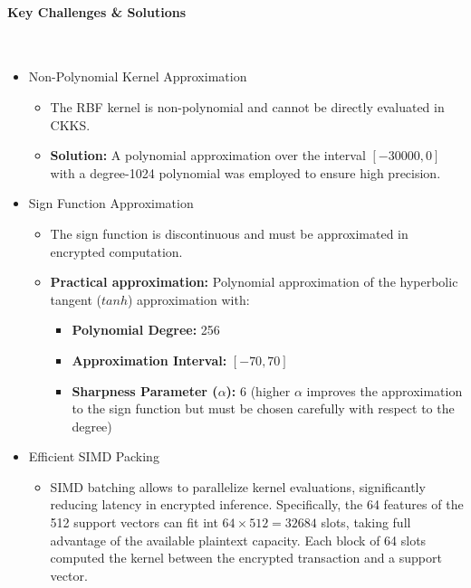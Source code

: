 \documentclass[article]{iacrtrans}
\begin{document}
\paragraph{Key Challenges \& Solutions}\mbox{}\\
\begin{itemize}
    \item Non-Polynomial Kernel Approximation
        \begin{itemize}
            \item The RBF kernel is non-polynomial and cannot be directly evaluated in CKKS.
            \item \textbf{Solution:} A polynomial approximation over the interval $[-30000, 0]$ with a degree-1024 polynomial was employed to ensure high precision.
        \end{itemize}
    \item Sign Function Approximation
        \begin{itemize}
            \item The sign function is discontinuous and must be approximated in encrypted computation.
            \item \textbf{Practical approximation:} Polynomial approximation of the hyperbolic tangent ($tanh$) approximation with:
                \begin{itemize}
                    \item \textbf{Polynomial Degree:} 256
                    \item \textbf{Approximation Interval:} $[-70, 70]$
                    \item \textbf{Sharpness Parameter ($\alpha$):} 6 (higher $\alpha$ improves the approximation to the sign function but must be chosen carefully with respect to the degree)
                \end{itemize}
        \end{itemize}
    \item Efficient SIMD Packing
        \begin{itemize}
            \item SIMD batching allows to parallelize kernel evaluations, significantly reducing latency in encrypted inference. Specifically, the 64 features of the 512 support vectors can fit int $64\times512=32684$ slots, taking full advantage of the available plaintext capacity. Each block of 64 slots computed the kernel between the encrypted transaction and a support vector. 
        \end{itemize}
\end{itemize}
\end{document}
